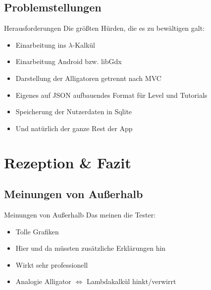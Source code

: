 \documentclass[18pt]{beamer}
\begin{document}
	\subsection{Problemstellungen}
	\begin{frame}[<+->]{Herausforderungen}
		Die größten Hürden, die es zu bewältigen galt: 
		\begin{itemize}
			\item Einarbeitung ins $\lambda$-Kalkül
			\item Einarbeitung Android bzw. libGdx
			\item Darstellung der Alligatoren getrennt nach MVC
			\item Eigenes auf JSON aufbauendes Format für Level und Tutorials
			\item Speicherung der Nutzerdaten in Sqlite
			\item Und natürlich der ganze Rest der App
		\end{itemize}
	\end{frame}


\section{Rezeption \& Fazit}
	\subsection{Meinungen von Außerhalb}
	\begin{frame}[<+->]{Meinungen von Außerhalb}
		Das meinen die Tester:
		\begin{itemize}
			\item Tolle Grafiken
			\item Hier und da müssten zusätzliche Erklärungen hin
			\item Wirkt sehr professionell
			\item Analogie Alligator $\Leftrightarrow$ Lambdakalkül hinkt/verwirrt
		\end{itemize}
	\end{frame}
\end{document}
